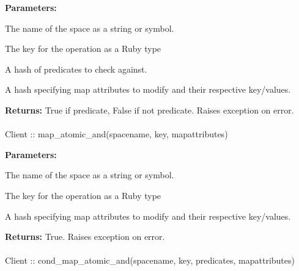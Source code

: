\noindent\textbf{Parameters:}
\begin{description}[labelindent=\widthof{{\code{mapattributes}}},leftmargin=*,noitemsep,nolistsep,align=right]
\item[\code{spacename}] The name of the space as a string or symbol.
\item[\code{key}] The key for the operation as a Ruby type
\item[\code{predicates}] A hash of predicates to check against.
\item[\code{mapattributes}] A hash specifying map attributes to modify and their respective key/values.
\end{description}

\noindent\textbf{Returns:}
True if predicate, False if not predicate.  Raises exception on error.

\paragraph{}
\label{api:ruby:map_atomic_and}
\begin{rubycode}
Client :: map_atomic_and(spacename, key, mapattributes)
\end{rubycode}


\noindent\textbf{Parameters:}
\begin{description}[labelindent=\widthof{{\code{mapattributes}}},leftmargin=*,noitemsep,nolistsep,align=right]
\item[\code{spacename}] The name of the space as a string or symbol.
\item[\code{key}] The key for the operation as a Ruby type
\item[\code{mapattributes}] A hash specifying map attributes to modify and their respective key/values.
\end{description}

\noindent\textbf{Returns:}
True.  Raises exception on error.

\paragraph{}
\label{api:ruby:cond_map_atomic_and}
\begin{rubycode}
Client :: cond_map_atomic_and(spacename, key, predicates, mapattributes)
\end{rubycode}


